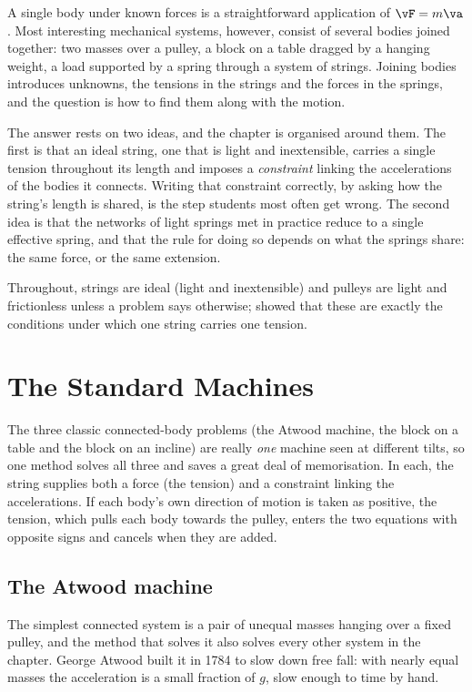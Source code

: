 \label{ch:connected}

A single body under known forces is a straightforward application of $\vF=m\va$. Most interesting
mechanical systems, however, consist of several bodies joined together: two masses over a pulley, a block
on a table dragged by a hanging weight, a load supported by a spring through a system of strings. Joining
bodies introduces unknowns, the tensions in the strings and the forces in the springs, and the question is
how to find them along with the motion.

The answer rests on two ideas, and the chapter is organised around them. The first is that an ideal string,
one that is light and inextensible, carries a single tension throughout its length and imposes a
\emph{constraint} linking the accelerations of the bodies it connects. Writing that constraint correctly,
by asking how the string's length is shared, is the step students most often get wrong. The second idea is that the networks of light springs met in practice
reduce to a single effective spring, and that the rule for doing so depends on what the springs share: the
same force, or the same extension.

Throughout, strings are ideal (light and inextensible) and pulleys are light and frictionless unless a
problem says otherwise;  showed that these are exactly the conditions under which one
string carries one tension.

\section{The Standard Machines}

The three classic connected-body problems (the Atwood machine, the block on a table and the block on an
incline) are really \emph{one} machine seen at different tilts, so one method solves all three and saves
a great deal of memorisation. In each, the string supplies both a force (the tension) and a constraint
linking the accelerations. If each body's own direction of motion is taken as positive, the tension,
which pulls each body towards the pulley, enters the two equations with opposite signs and cancels when
they are added.

\subsection{The Atwood machine}

The simplest connected system is a pair of unequal masses hanging over a fixed pulley, and the
method that solves it also solves every other system in the chapter. George Atwood built it in 1784 to slow down free
fall: with nearly equal masses the acceleration is a small fraction of $g$, slow enough to time by hand.

